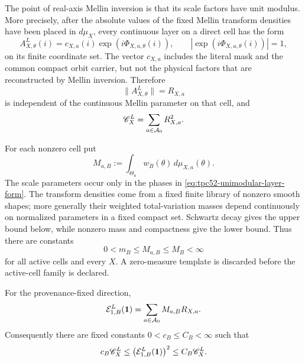 The point of real-axis Mellin inversion is that its scale factors have unit
modulus.  More precisely, after the absolute values of the fixed Mellin
transform densities have been placed in \(d\mu_X\), every continuous layer
on a direct cell has the form
\begin{equation}
 A_{X,\theta}^L(i)
 =c_{X,a}(i)\exp(i\Phi_{X,a,\theta}(i)),
 \qquad |\exp(i\Phi_{X,a,\theta}(i))|=1,
 \label{eq:tpc52-unimodular-layer-form}
\end{equation}
on its finite coordinate set.  The vector \(c_{X,a}\) includes the literal
mask and the common compact orbit carrier, but not the physical factors that
are reconstructed by Mellin inversion.  Therefore
\begin{equation}
 \|A_{X,\theta}^L\|=R_{X,a}
 \label{eq:tpc52-layer-carrier-norm}
\end{equation}
is independent of the continuous Mellin parameter on that cell, and
\begin{equation}
 \mathscr C_X^L=\sum_{a\in\mathcal A_0}R_{X,a}^2.
 \label{eq:tpc52-carrier-cell-square}
\end{equation}

For each nonzero cell put
\begin{equation}
 M_{a,B}:=\int_{\Theta_a}w_B(\theta)\,d\mu_{X,a}(\theta).
 \label{eq:tpc52-cell-weighted-Mellin-mass}
\end{equation}
The scale parameters occur only in the phases in
\eqref{eq:tpc52-unimodular-layer-form}.  The transform densities come from a
fixed finite library of nonzero smooth shapes; more generally their weighted
total-variation masses depend continuously on normalized parameters in a
fixed compact set.  Schwartz decay gives the upper bound below, while
nonzero mass and compactness give the lower bound.  Thus there are constants
\begin{equation}
 0<m_B\le M_{a,B}\le M_B<\infty
 \label{eq:tpc52-fixed-Mellin-mass-bounds}
\end{equation}
for all active cells and every \(X\).  A zero-measure template is discarded
before the active-cell family is declared.

\begin{proposition}
\label{prop:tpc52-finite-cell-carrier-identity}
For the provenance-fixed direction,
\begin{equation}
 \mathcal E_{1,B}^L(\mathbf 1)=
 \sum_{a\in\mathcal A_0}M_{a,B}R_{X,a}.
 \label{eq:tpc52-envelope-cell-sum}
\end{equation}
Consequently there are fixed constants \(0<c_B\le C_B<\infty\) such
that
\begin{equation}
 c_B\mathscr C_X^L
 \le \bigl(\mathcal E_{1,B}^L(\mathbf 1)\bigr)^2
 \le C_B\mathscr C_X^L.
 \label{eq:tpc52-envelope-carrier-equivalence}
\end{equation}
\end{proposition}

